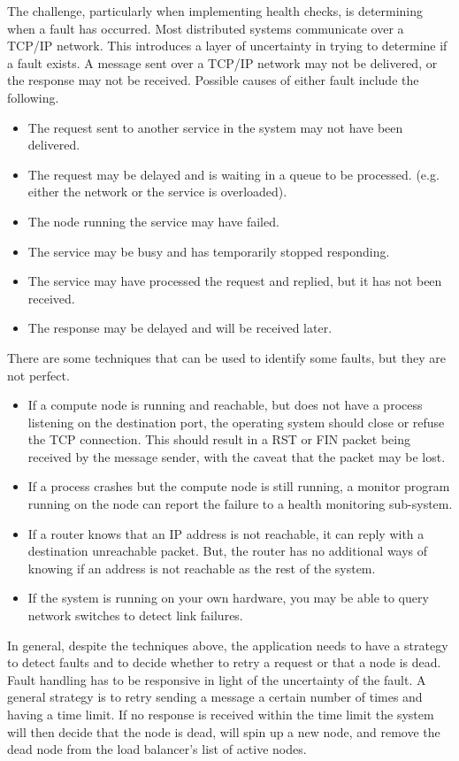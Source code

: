 The challenge, particularly when implementing health checks, is determining when a fault has occurred.
Most distributed systems communicate over a TCP/IP network.
This introduces a layer of uncertainty in trying to determine if a fault exists.
A message sent over a TCP/IP network may not be delivered, or the response may not be received.
Possible causes of either fault include the following.
\begin{itemize}
    \item The request sent to another service in the system may not have been delivered.
    \item The request may be delayed and is waiting in a queue to be processed. (e.g. either the network or the service is overloaded).
    \item The node running the service may have failed.
    \item The service may be busy and has temporarily stopped responding.
    \item The service may have processed the request and replied, but it has not been received.
    \item The response may be delayed and will be received later.
\end{itemize}

There are some techniques that can be used to identify some faults, but they are not perfect.
\begin{itemize}
    \item If a compute node is running and reachable, but does not have a process listening on the destination port, the operating system should close or refuse the TCP connection. This should result in a RST or FIN packet being received by the message sender, with the caveat that the packet may be lost.
    \item If a process crashes but the compute node is still running, a monitor program running on the node can report the failure to a health monitoring sub-system.
    \item If a router knows that an IP address is not reachable, it can reply with a destination unreachable packet. But, the router has no additional ways of knowing if an address is not reachable as the rest of the system.
    \item If the system is running on your own hardware, you may be able to query network switches to detect link failures.
\end{itemize}

In general, despite the techniques above, the application needs to have a strategy to detect faults
and to decide whether to retry a request or that a node is dead.
Fault handling has to be responsive in light of the uncertainty of the fault.
A general strategy is to retry sending a message a certain number of times and having a time limit.
If no response is received within the time limit the system will then decide that the node is dead,
will spin up a new node, and remove the dead node from the load balancer's list of active nodes.

